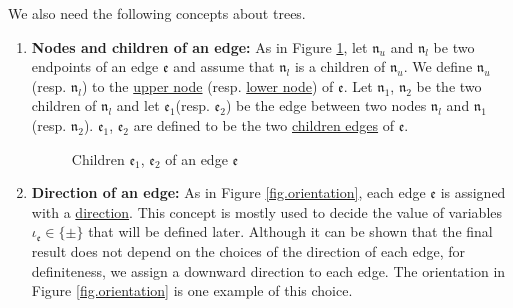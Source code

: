 We also need the following concepts about trees.
\begin{defn}\label{def.treemore}
\begin{enumerate}
    \item \textbf{Nodes and children of an edge:} As in Figure \ref{fig.childrenofedge}, let $\mathfrak{n}_{u}$ and $\mathfrak{n}_{l}$ be two endpoints of an edge $\mathfrak{e}$ and assume that $\mathfrak{n}_{l}$ is a children of $\mathfrak{n}_{u}$. We define $\mathfrak{n}_{u}$ (resp. $\mathfrak{n}_{l}$) to the \underline{upper node} (resp. \underline{lower node}) of $\mathfrak{e}$. Let $\mathfrak{n}_1$, $\mathfrak{n}_2$ be the two children of $\mathfrak{n}_{l}$ and let $\mathfrak{e}_1$(resp. $\mathfrak{e}_2$) be the edge between two nodes $\mathfrak{n}_{l}$ and $\mathfrak{n}_1$(resp. $\mathfrak{n}_2$). $\mathfrak{e}_1$, $\mathfrak{e}_2$ are defined to be the two \underline{children edges} of $\mathfrak{e}$. 
    \begin{figure}[H]
    \centering
        \caption{Children $\mathfrak{e}_1$, $\mathfrak{e}_2$ of an edge $\mathfrak{e}$}
        \label{fig.childrenofedge}
    \end{figure}
    \item \textbf{Direction of an edge:} As in Figure \ref{fig.orientation}, each edge $\mathfrak{e}$ is  assigned with a \underline{direction}. This concept is mostly used to decide the value of variables $\iota_{\mathfrak{e}}\in\{\pm\}$ that will be defined later. Although it can be shown that the final result does not depend on the choices of the direction of each edge, for definiteness, we assign a downward direction to each edge. The orientation in Figure \ref{fig.orientation} is one example of this choice.

\end{enumerate}
\end{defn}
